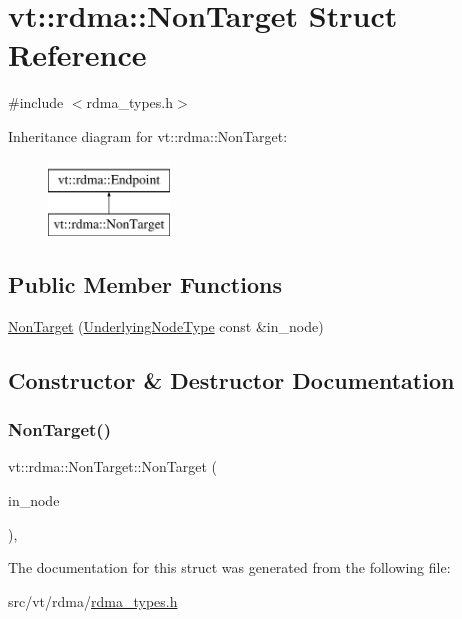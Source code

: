 \hypertarget{structvt_1_1rdma_1_1_non_target}{}\section{vt\+:\+:rdma\+:\+:Non\+Target Struct Reference}
\label{structvt_1_1rdma_1_1_non_target}


{\ttfamily \#include $<$rdma\+\_\+types.\+h$>$}

Inheritance diagram for vt\+:\+:rdma\+:\+:Non\+Target\+:\begin{figure}[H]
\begin{center}
\leavevmode
\includegraphics[height=2.000000cm]{structvt_1_1rdma_1_1_non_target}
\end{center}
\end{figure}
\subsection*{Public Member Functions}
\begin{DoxyCompactItemize}
\item 
\hyperlink{structvt_1_1rdma_1_1_non_target_a69f1bc7ca64bafacd10449b8a7b24d38}{Non\+Target} (\hyperlink{namespacevt_1_1rdma_a20d01bc82b95453c162d4b9857a4a78a}{Underlying\+Node\+Type} const \&in\+\_\+node)
\end{DoxyCompactItemize}


\subsection{Constructor \& Destructor Documentation}
\mbox{\label{structvt_1_1rdma_1_1_non_target_a69f1bc7ca64bafacd10449b8a7b24d38}} 
\subsubsection{\texorpdfstring{Non\+Target()}{NonTarget()}}
{\footnotesize\ttfamily vt\+::rdma\+::\+Non\+Target\+::\+Non\+Target (\begin{DoxyParamCaption}\item[{\hyperlink{namespacevt_1_1rdma_a20d01bc82b95453c162d4b9857a4a78a}{Underlying\+Node\+Type} const \&}]{in\+\_\+node }\end{DoxyParamCaption})\hspace{0.3cm}{\ttfamily [inline]}, {\ttfamily [explicit]}}



The documentation for this struct was generated from the following file\+:\begin{DoxyCompactItemize}
\item 
src/vt/rdma/\hyperlink{rdma__types_8h}{rdma\+\_\+types.\+h}\end{DoxyCompactItemize}
